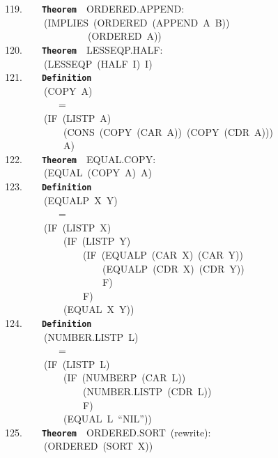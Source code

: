 \documentclass[11pt]{book}
\newenvironment{pubasis}{\begin{flushleft}\ttfamily\small}{\normalsize\rmfamily\end{flushleft}}
\newcommand{\axiomordefinition}[1]{\vspace{6pt}\texttt{\textbf{#1}}}
\begin{document}
\begin{pubasis}
119.~~~~\axiomordefinition{Theorem}~~ORDERED.APPEND:\\
~~~~~~~~(IMPLIES~(ORDERED~(APPEND~A~B))\\
~~~~~~~~~~~~~~~~~(ORDERED~A))\\

120.~~~~\axiomordefinition{Theorem}~~LESSEQP.HALF:\\
~~~~~~~~(LESSEQP~(HALF~I)~I)\\

121.~~~~\axiomordefinition{Definition}\\
~~~~~~~~(COPY~A)\\
~~~~~~~~~~~=\\
~~~~~~~~(IF~(LISTP~A)\\
~~~~~~~~~~~~(CONS~(COPY~(CAR~A))~(COPY~(CDR~A)))\\
~~~~~~~~~~~~A)\\

122.~~~~\axiomordefinition{Theorem}~~EQUAL.COPY:\\
~~~~~~~~(EQUAL~(COPY~A)~A)\\

123.~~~~\axiomordefinition{Definition}\\
~~~~~~~~(EQUALP~X~Y)\\
~~~~~~~~~~~=\\
~~~~~~~~(IF~(LISTP~X)\\
~~~~~~~~~~~~(IF~(LISTP~Y)\\
~~~~~~~~~~~~~~~~(IF~(EQUALP~(CAR~X)~(CAR~Y))\\
~~~~~~~~~~~~~~~~~~~~(EQUALP~(CDR~X)~(CDR~Y))\\
~~~~~~~~~~~~~~~~~~~~F)\\
~~~~~~~~~~~~~~~~F)\\
~~~~~~~~~~~~(EQUAL~X~Y))\\

124.~~~~\axiomordefinition{Definition}\\
~~~~~~~~(NUMBER.LISTP~L)\\
~~~~~~~~~~~=\\
~~~~~~~~(IF~(LISTP~L)\\
~~~~~~~~~~~~(IF~(NUMBERP~(CAR~L))\\
~~~~~~~~~~~~~~~~(NUMBER.LISTP~(CDR~L))\\
~~~~~~~~~~~~~~~~F)\\
~~~~~~~~~~~~(EQUAL~L~``NIL''))\\

125.~~~~\axiomordefinition{Theorem}~~ORDERED.SORT~(rewrite):\\
~~~~~~~~(ORDERED~(SORT~X))\\


\end{pubasis}
\end{document}
